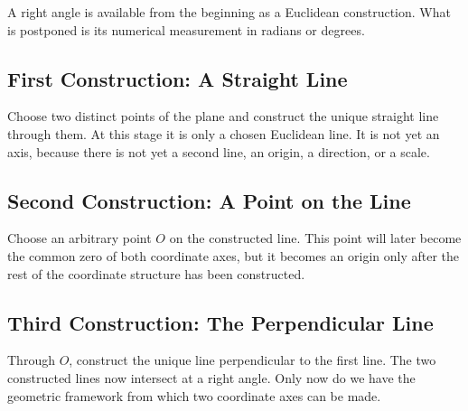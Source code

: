 A right angle is available from the beginning as a Euclidean construction. What
is postponed is its numerical measurement in radians or degrees.

\subsection{First Construction: A Straight Line}

Choose two distinct points of the plane and construct the unique straight line
through them. At this stage it is only a chosen Euclidean line. It is not yet an
axis, because there is not yet a second line, an origin, a direction, or a
scale.

\begin{center}
\end{center}

\subsection{Second Construction: A Point on the Line}

Choose an arbitrary point $O$ on the constructed line. This point will later
become the common zero of both coordinate axes, but it becomes an origin only
after the rest of the coordinate structure has been constructed.

\begin{center}
\end{center}

\subsection{Third Construction: The Perpendicular Line}

Through $O$, construct the unique line perpendicular to the first line. The two
constructed lines now intersect at a right angle. Only now do we have the
geometric framework from which two coordinate axes can be made.

